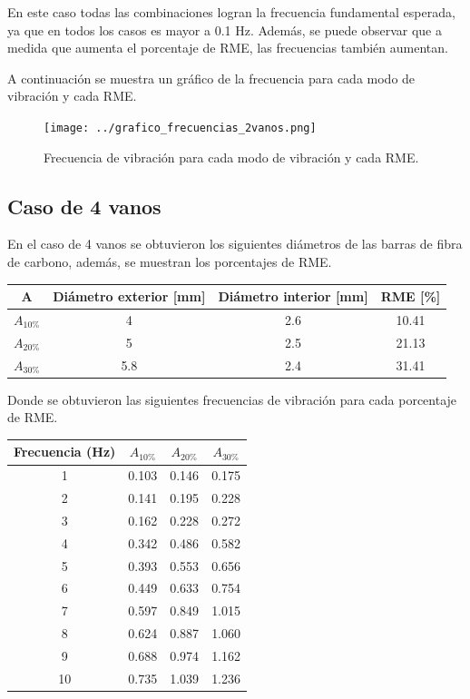 En este caso todas las combinaciones logran la frecuencia fundamental esperada, ya que en todos los casos es mayor a 0.1 Hz. Además, se puede observar que a medida que aumenta el porcentaje de RME, las frecuencias también aumentan.

A continuación se muestra un gráfico de la frecuencia para cada modo de vibración y cada RME. 

\begin{figure}[H]
    \centering
    \texttt{[image: ../grafico\_frecuencias\_2vanos.png]}
    \caption{Frecuencia de vibración para cada modo de vibración y cada RME.}
\end{figure}

\subsection{Caso de 4 vanos}
En el caso de 4 vanos se obtuvieron los siguientes diámetros de las barras de fibra de carbono, además, se muestran los porcentajes de RME.

\begin{table}[H]
    \centering
    \begin{tabular}{cccc}
    \toprule
     A & Diámetro exterior [mm] & Diámetro interior [mm] & RME [\%] \\
    \midrule
     $A_{10\%}$ &  4 &  2.6 &  10.41 \\
     $A_{20\%}$ &  5 &  2.5 &  21.13 \\
     $A_{30\%}$ &  5.8 &  2.4 &  31.41 \\
    \bottomrule
    \end{tabular}
\end{table}

Donde se obtuvieron las siguientes frecuencias de vibración para cada porcentaje de RME.

\begin{table}[H]
    \centering
    \begin{tabular}{cccc}
    \toprule
     Frecuencia (Hz) & $A_{10\%}$ & $A_{20\%}$ & $A_{30\%}$ \\
    \midrule
     1 &       0.103 &       0.146 &       0.175 \\
     2 &       0.141 &       0.195 &       0.228 \\
     3 &       0.162 &       0.228 &       0.272 \\
     4 &       0.342 &       0.486 &       0.582 \\
     5 &       0.393 &       0.553 &       0.656 \\
     6 &       0.449 &       0.633 &       0.754 \\
     7 &       0.597 &       0.849 &       1.015 \\
     8 &       0.624 &       0.887 &       1.060 \\
     9 &       0.688 &       0.974 &       1.162 \\
     10 &       0.735 &       1.039 &       1.236 \\
    \bottomrule
    \end{tabular}
\end{table}

